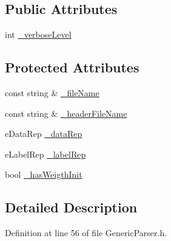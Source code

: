 \subsection*{Public Attributes}
\begin{DoxyCompactItemize}
\item 
int \hyperlink{classMultiBoost_1_1GenericParser_a46c61253bc59b8bcff0bbb5bd1536a41}{\-\_\-verbose\-Level}
\end{DoxyCompactItemize}
\subsection*{Protected Attributes}
\begin{DoxyCompactItemize}
\item 
const string \& \hyperlink{classMultiBoost_1_1GenericParser_a56736441432a14e17a81e19b4707e672}{\-\_\-file\-Name}
\item 
const string \& \hyperlink{classMultiBoost_1_1GenericParser_a0569fb29d9603285df0fe30fc6cf6c87}{\-\_\-header\-File\-Name}
\item 
e\-Data\-Rep \hyperlink{classMultiBoost_1_1GenericParser_a37390f83bc3e4b3788d7f007aeb92389}{\-\_\-data\-Rep}
\item 
e\-Label\-Rep \hyperlink{classMultiBoost_1_1GenericParser_ab06970eec068271831eda07846defb8b}{\-\_\-label\-Rep}
\item 
bool \hyperlink{classMultiBoost_1_1GenericParser_a2a3966c40707b69fde1dffc85a04a399}{\-\_\-has\-Weigth\-Init}
\end{DoxyCompactItemize}


\subsection{Detailed Description}


Definition at line 56 of file Generic\-Parser.\-h.



